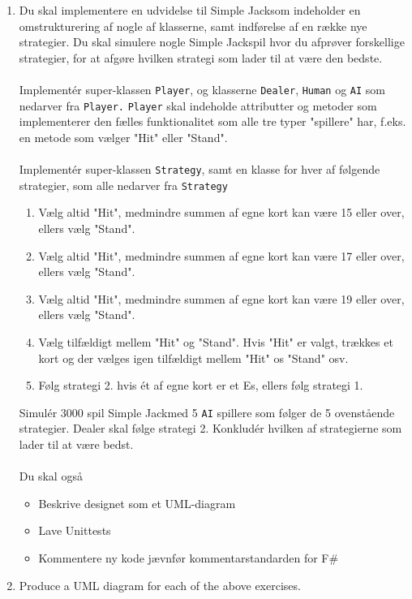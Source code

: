 \documentclass[a4paper,12pt]{article}
\newcommand{\sbl}{Simple Jack}
\begin{document}
\begin{enumerate}[label=11ø.\arabic*,start=0]
\item Du skal implementere en udvidelse til \sbl som indeholder en omstrukturering af nogle af klasserne, samt indførelse af en række nye strategier. Du skal simulere nogle \sbl spil hvor du afprøver forskellige strategier, for at afgøre
  hvilken strategi som lader til at være den bedste. \\ \\
  Implement\'{e}r super-klassen \texttt{Player}, og klasserne \texttt{Dealer}, \texttt{Human} og \texttt{AI} som nedarver fra \texttt{Player.} \texttt{Player} skal indeholde attributter og metoder som implementerer den fælles funktionalitet
  som alle tre typer "spillere" har, f.eks. en metode som vælger "Hit" eller "Stand". \\ \\
  Implement\'{e}r super-klassen \texttt{Strategy}, samt en klasse for hver af følgende strategier, som alle nedarver fra \texttt{Strategy}
  \begin{enumerate}
  \item Vælg altid "Hit", medmindre summen af egne kort kan være 15 eller over, ellers vælg "Stand".
  \item Vælg altid "Hit", medmindre summen af egne kort kan være 17 eller over, ellers vælg "Stand".
  \item Vælg altid "Hit", medmindre summen af egne kort kan være 19 eller over, ellers vælg "Stand".
  \item Vælg tilfældigt mellem "Hit" og "Stand". Hvis "Hit" er valgt, trækkes et kort og der vælges igen tilfældigt mellem
    "Hit" os "Stand" osv.
  \item Følg strategi 2. hvis \'{e}t af egne kort er et Es, ellers følg strategi 1.
  \end{enumerate}
  Simul\'{e}r 3000 spil \sbl med 5 \texttt{AI} spillere som følger de 5 ovenstående strategier.
  Dealer skal følge strategi 2. 
  Konklud\'{e}r hvilken af strategierne som lader til at være bedst. \\ \\
  Du skal også
  \begin{itemize}
  \item Beskrive designet som et UML-diagram
  \item Lave Unittests
  \item Kommentere ny kode jævnfør kommentarstandarden for F\#
  \end{itemize}
  
\item Produce a UML diagram for each of the above exercises.
  
\end{enumerate}
\end{document}
